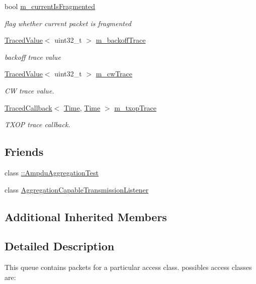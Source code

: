 \begin{DoxyCompactItemize}
bool \hyperlink{classns3_1_1EdcaTxopN_af17d826141cb2e87903a268e5f9f57ad}{m\+\_\+current\+Is\+Fragmented}
\begin{DoxyCompactList}\small\item\em flag whether current packet is fragmented \end{DoxyCompactList}\item 
\hyperlink{classns3_1_1TracedValue}{Traced\+Value}$<$ uint32\+\_\+t $>$ \hyperlink{classns3_1_1EdcaTxopN_a3a10f51712278eab1cb3ab744fc7da6f}{m\+\_\+backoff\+Trace}
\begin{DoxyCompactList}\small\item\em backoff trace value \end{DoxyCompactList}\item 
\hyperlink{classns3_1_1TracedValue}{Traced\+Value}$<$ uint32\+\_\+t $>$ \hyperlink{classns3_1_1EdcaTxopN_ad55746ea4042e254b2267905e6ecfe66}{m\+\_\+cw\+Trace}
\begin{DoxyCompactList}\small\item\em CW trace value. \end{DoxyCompactList}\item 
\hyperlink{classns3_1_1TracedCallback}{Traced\+Callback}$<$ \hyperlink{classns3_1_1Time}{Time}, \hyperlink{classns3_1_1Time}{Time} $>$ \hyperlink{classns3_1_1EdcaTxopN_a451e4a459e0cf4946cc57cc4fe4e64cc}{m\+\_\+txop\+Trace}
\begin{DoxyCompactList}\small\item\em T\+X\+OP trace callback. \end{DoxyCompactList}\end{DoxyCompactItemize}
\subsection*{Friends}
\begin{DoxyCompactItemize}
\item 
class \hyperlink{classns3_1_1EdcaTxopN_ac40416d983d6f5074b1f4d2d84900b75}{\+::\+Ampdu\+Aggregation\+Test}
\item 
class \hyperlink{classns3_1_1EdcaTxopN_a8cc48b082c4f0c3cb2a41f8dfd138405}{Aggregation\+Capable\+Transmission\+Listener}
\end{DoxyCompactItemize}
\subsection*{Additional Inherited Members}


\subsection{Detailed Description}
This queue contains packets for a particular access class. possibles access classes are\+:

